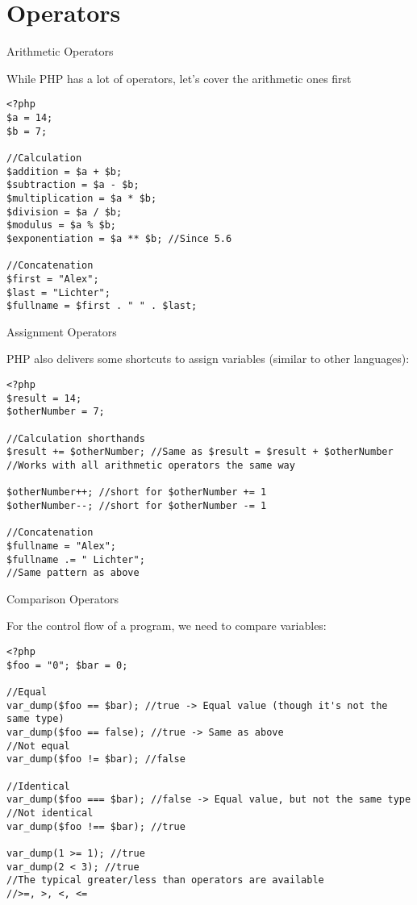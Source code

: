 \section{Operators}

\begin{frame}[fragile]{Arithmetic Operators}

While PHP has a lot of operators, let's cover the arithmetic ones first \pause

\begin{lstlisting}
<?php
$a = 14;
$b = 7;

//Calculation
$addition = $a + $b;
$subtraction = $a - $b;
$multiplication = $a * $b;
$division = $a / $b;
$modulus = $a % $b;
$exponentiation = $a ** $b; //Since 5.6

//Concatenation
$first = "Alex";
$last = "Lichter";
$fullname = $first . " " . $last;
\end{lstlisting}

\end{frame}

\begin{frame}[fragile]{Assignment Operators}

PHP also delivers some shortcuts to assign variables (similar to other languages):\pause

\begin{lstlisting}
<?php
$result = 14;
$otherNumber = 7;

//Calculation shorthands
$result += $otherNumber; //Same as $result = $result + $otherNumber
//Works with all arithmetic operators the same way 

$otherNumber++; //short for $otherNumber += 1
$otherNumber--; //short for $otherNumber -= 1

//Concatenation
$fullname = "Alex";
$fullname .= " Lichter";
//Same pattern as above
\end{lstlisting}

\end{frame}

\begin{frame}[fragile]{Comparison Operators}

For the control flow of a program, we need to compare variables:\pause
\begin{lstlisting}
<?php
$foo = "0"; $bar = 0;

//Equal
var_dump($foo == $bar); //true -> Equal value (though it's not the same type)
var_dump($foo == false); //true -> Same as above
//Not equal
var_dump($foo != $bar); //false

//Identical
var_dump($foo === $bar); //false -> Equal value, but not the same type
//Not identical
var_dump($foo !== $bar); //true

var_dump(1 >= 1); //true
var_dump(2 < 3); //true
//The typical greater/less than operators are available 
//>=, >, <, <=
\end{lstlisting}

\end{frame}

